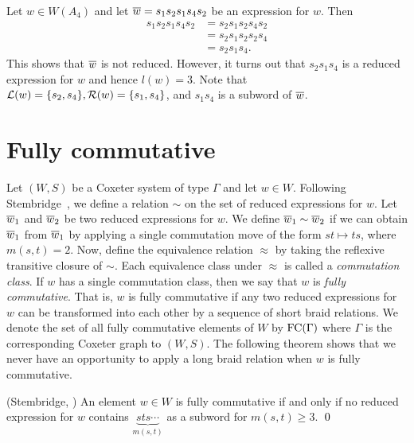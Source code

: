 \begin{example}
Let $w\in W(A_{4})$ and let $\overline{w} =s_{1}s_{2}s_{1}s_{4}s_{2}$ be an expression for $w$. Then
\begin{align*}
s_{1}s_{2}s_{1}s_{4}s_{2}&=  s_{2}s_{1}s_{2}s_{4}s_{2}\\
&=  s_{2}s_{1}s_{2}s_{2}s_{4} \\
&=  s_{2}s_{1}s_{4}. 
\end{align*}
This shows that $\overline{w}$ is not reduced. However, it turns out that $s_{2}s_{1}s_{4}$ is a reduced expression for $w$ and hence $l(w)=3$. Note that $\mathcal{L}(w)=\{s_2,s_4\},\mathcal{R}(w)=\{s_1,s_4\}$, and $s_{1}s_{4}$ is a subword of $\overline{w}$.
\end{example}

 




\section{Fully commutative}\label{sec:FC}

Let $(W,S)$ be a Coxeter system of type $\Gamma$ and let $w \in W$. Following Stembridge~\cite{Stembridge1996}, we define a relation $\sim$ on the set of reduced expressions for $w$. Let $\overline{w}_1$ and $\overline{w}_2$ be two reduced expressions for $w$. We define $\overline{w}_1 \sim \overline{w}_2$ if we can obtain $\overline{w}_1$ from $\overline{w}_1$ by applying a single commutation move of the form $st\mapsto ts$, where $m(s,t)=2$. Now, define the equivalence relation $\approx$ by taking the reflexive transitive closure of $\sim$. Each equivalence class under $\approx$ is called a \emph{commutation class}. If $w$ has a single commutation class, then we say that $w$ is \emph{fully commutative}. That is, $w$ is fully commutative if any two reduced expressions for $w$ can be transformed into each other by a sequence of short braid relations. We denote the set of all fully commutative elements of $W$ by $\operatorname{FC}(\Gamma)$ where $\Gamma$ is the corresponding Coxeter graph to $(W,S)$. The following theorem shows that we never have an opportunity to apply a long braid relation when $w$ is fully commutative.

\begin{theorem}\label{stem}
{\rm(Stembridge, \cite{Stembridge1996})} An element $w\in W$ is fully commutative if and only if no reduced expression for $w$ contains ${\underbrace{sts \cdots }_{m(s,t)} }$ as a subword for $m(s,t)\ge3$.
\textcolor{black}{\qed}
\end{theorem}

